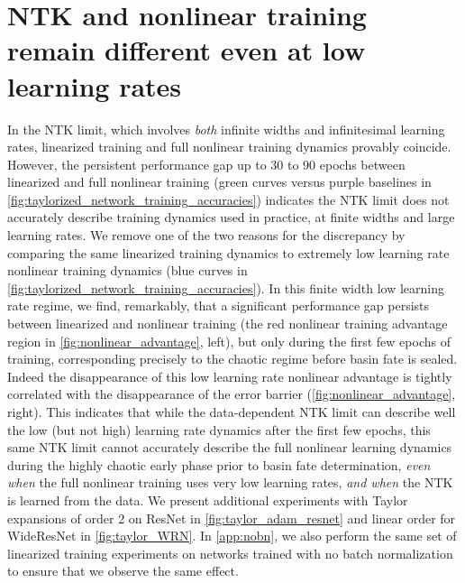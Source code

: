\documentclass{article}
\begin{document}
\vspace*{-0.3cm}
\section{NTK and nonlinear training remain different even at low learning rates}
\vspace*{-0.3cm}
\label{sec:nonlinadv}

In the NTK limit, which involves {\it both} infinite widths and infinitesimal  learning rates, linearized training and full nonlinear training dynamics provably coincide. However, the persistent performance gap up to 30 to 90 epochs between linearized and full nonlinear training (green curves versus purple baselines in \cref{fig:taylorized_network_training_accuracies}) indicates the NTK limit does not accurately describe training dynamics used in practice, at finite widths and large learning rates. We remove one of the two reasons for the discrepancy by comparing the same linearized training dynamics to extremely low learning rate nonlinear training dynamics (blue curves in \cref{fig:taylorized_network_training_accuracies}).  In this finite width low learning rate regime, we find, remarkably, that a significant performance gap persists between linearized and nonlinear training (the red nonlinear training advantage region in \cref{fig:nonlinear_advantage}, left), but only during the first few epochs of training, corresponding precisely to the chaotic regime before basin fate is sealed. Indeed the disappearance of this low learning rate nonlinear advantage is tightly correlated with the disappearance of the error barrier (\cref{fig:nonlinear_advantage}, right).  This indicates that while the data-dependent NTK limit can describe well the low (but not high) learning rate dynamics after the first few epochs, this same NTK limit cannot accurately describe the full nonlinear learning dynamics during the highly chaotic early phase prior to basin fate determination, {\it even when} the full nonlinear training uses very low learning rates, {\it and when} the NTK is learned from the data. We present additional experiments with Taylor expansions of order 2 on ResNet in \cref{fig:taylor_adam_resnet} and linear order for WideResNet in \cref{fig:taylor_WRN}. In \cref{app:nobn}, we also perform the same set of linearized training experiments on networks trained with no batch normalization to ensure that we observe the same effect.
\end{document}
